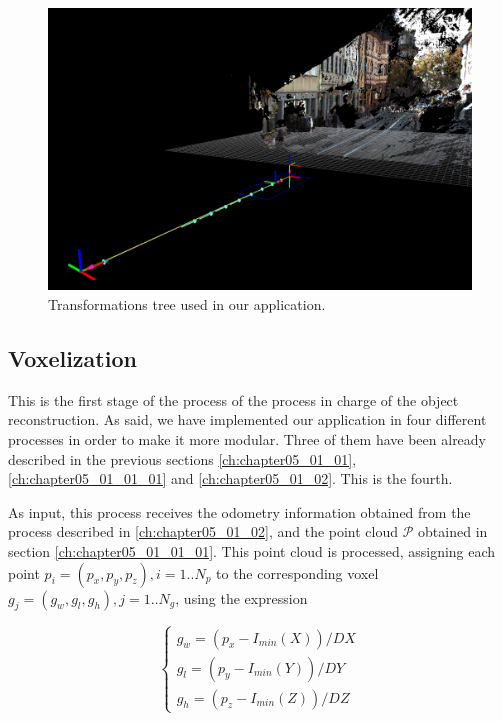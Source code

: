 \begin{figure}[th]
  \centering
  \includegraphics{tfs}
  \caption{Transformations tree used in our application.  }\label{fig:cp05_tfs}
\end{figure}

\subsection{Voxelization}\label{ch:chapter05_01_03}

This is the first stage of the process of the process in charge of the object reconstruction. As said, we have implemented our application in four different processes in order to make it more modular. Three of them have been already described in the previous sections \ref{ch:chapter05_01_01}, \ref{ch:chapter05_01_01_01} and \ref{ch:chapter05_01_02}. This is the fourth.

As input, this process receives the odometry information obtained from the process described in \ref{ch:chapter05_01_02}, and the point cloud $\mathcal{P}$ obtained in section \ref{ch:chapter05_01_01_01}. This point cloud is processed, assigning each point $p_i = (p_x, p_y, p_z), i=1..N_p$ to the corresponding voxel $g_j=(g_w, g_l, g_h), j=1..N_g$, using the expression

\begin{equation}\label{eq:cp05_point_to_voxel}
\begin{cases}
g_w = (p_x - I_{min}(X)) / DX\\
g_l = (p_y - I_{min}(Y)) / DY\\
g_h = (p_z - I_{min}(Z)) / DZ
\end{cases}
\end{equation}

